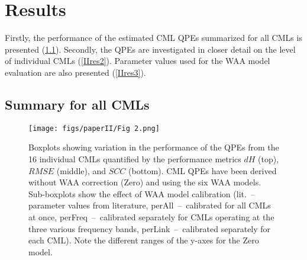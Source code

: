 \documentclass{ctuthesis}\usepackage[]{graphicx}\usepackage[]{color}
\begin{document}
\section{Results}

Firstly, the performance of the estimated CML QPEs summarized for all CMLs is presented (\ref{IIres1}). Secondly, the QPEs are investigated in closer detail on the level of individual CMLs (\ref{IIres2}).  Parameter values used for the WAA model evaluation are also presented (\ref{IIres3}).


\subsection{Summary for all CMLs} \label{IIres1}

\begin{figure}[h]
\begin{center}
\texttt{[image: figs/paperII/Fig 2.png]}
\caption{Boxplots showing variation in the performance of the QPEs from the 16 individual CMLs quantified by the performance metrics $dH$ (top), $RMSE$ (middle), and $SCC$ (bottom). CML QPEs have been derived without WAA correction (Zero) and using the six WAA models. Sub-boxplots show the effect of WAA model calibration (lit. \,--\, parameter values from literature, perAll \,--\, calibrated for all CMLs at once, perFreq \,--\, calibrated separately for CMLs operating at the three various frequency bands, perLink \,--\, calibrated separately for each CML). Note the different ranges of the y-axes for the Zero model.} 
\label{fig:II_2}
\end{center}
\end{figure}
\end{document}
